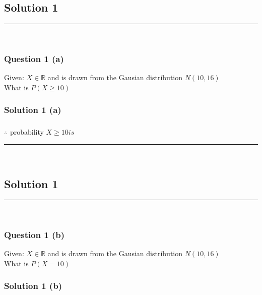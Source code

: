 \documentclass{article}
\begin{document}
\pagestyle{fancy}

\subsection*{Solution 1}
\noindent\rule{\textwidth}{0.4pt}\\
\subsubsection*{Question 1 (a)}
\begin{flushleft}
    Given: $X \in \mathbb{R}$ and is drawn from the Gausian distribution $N(10,16)$\\
    What is $P(X \geq 10)$
\end{flushleft}

\subsubsection*{Solution 1 (a)}

\subsubsection*{\normalfont}{$\therefore$ probability $X \geq 10 is$}

\noindent\rule{\textwidth}{0.4pt}\\

\newpage

\subsection*{Solution 1}
\noindent\rule{\textwidth}{0.4pt}\\
\subsubsection*{Question 1 (b)}
\begin{flushleft}
    Given: $X \in \mathbb{R}$ and is drawn from the Gausian distribution $N(10,16)$\\
    What is $P(X = 10)$
\end{flushleft}

\subsubsection*{Solution 1 (b)}
\end{document}
